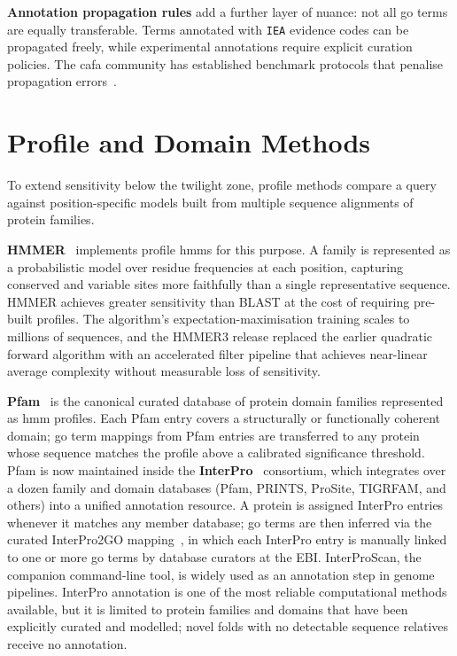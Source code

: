 \textbf{Annotation propagation rules} add a further layer of nuance: not all \gls{go}
terms are equally transferable. Terms annotated with \texttt{IEA} evidence codes
can be propagated freely, while experimental annotations require explicit
curation policies. The \gls{cafa} community has established benchmark protocols
that penalise propagation errors~\cite{zhou2019cafa3}.

\section{Profile and Domain Methods}
\label{sec:related-hmm}

To extend sensitivity below the twilight zone, profile methods compare a query
against position-specific models built from multiple sequence alignments of
protein families.

\textbf{HMMER}~\cite{eddy2011hmmer} implements profile \glspl{hmm} for this
purpose. A family is represented as a probabilistic model over residue
frequencies at each position, capturing conserved and variable sites more
faithfully than a single representative sequence. HMMER achieves greater
sensitivity than BLAST at the cost of requiring pre-built profiles. The
algorithm's expectation-maximisation training scales to millions of sequences,
and the HMMER3 release replaced the earlier quadratic forward algorithm with an
accelerated filter pipeline that achieves near-linear average complexity without
measurable loss of sensitivity.

\textbf{Pfam}~\cite{mistry2021pfam} is the canonical curated database of protein
domain families represented as \gls{hmm} profiles. Each Pfam entry covers a
structurally or functionally coherent domain; \gls{go} term mappings from Pfam
entries are transferred to any protein whose sequence matches the profile above a
calibrated significance threshold. Pfam is now maintained inside the
\textbf{InterPro}~\cite{blum2021interpro} consortium, which integrates over a dozen
family and domain databases (Pfam, PRINTS, ProSite, TIGRFAM, and others) into a
unified annotation resource. A protein is assigned InterPro entries whenever it
matches any member database; \gls{go} terms are then inferred via the
curated InterPro2GO mapping~\cite{burge2012interpro2go}, in which each
InterPro entry is manually linked to one or more \gls{go} terms by database
curators at the EBI. InterProScan, the companion command-line tool, is widely used as an
annotation step in genome pipelines. InterPro annotation is one of the most
reliable computational methods available, but it is limited to protein families
and domains that have been explicitly curated and modelled; novel folds with no
detectable sequence relatives receive no annotation.

